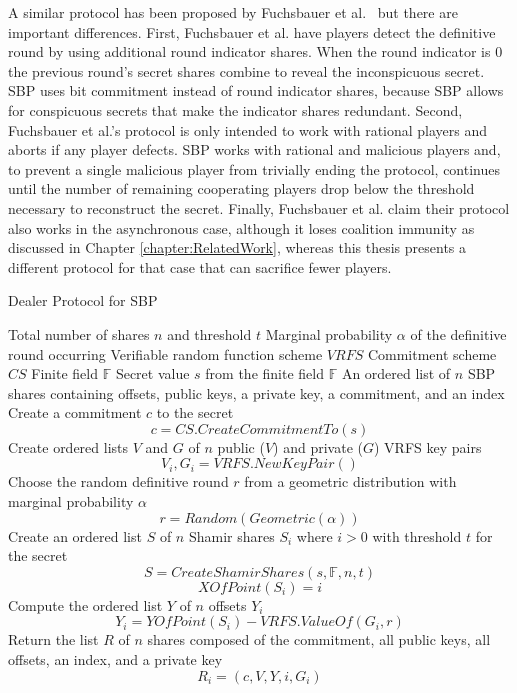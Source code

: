\documentclass[12pt]{dalcsthesis}
\begin{document}
A similar protocol has been proposed by Fuchsbauer et al.~\cite{fuch10} but there are important differences. First, Fuchsbauer et al. have players detect the definitive round by using additional round indicator shares. When the round indicator is 0 the previous round's secret shares combine to reveal the inconspicuous secret. SBP uses bit commitment instead of round indicator shares, because SBP allows for conspicuous secrets that make the indicator shares redundant. Second, Fuchsbauer et al.'s protocol is only intended to work with rational players and aborts if any player defects. SBP works with rational and malicious players and, to prevent a single malicious player from trivially ending the protocol, continues until the number of remaining cooperating players drop below the threshold necessary to reconstruct the secret. Finally, Fuchsbauer et al. claim their protocol also works in the asynchronous case, although it loses coalition immunity as discussed in Chapter \ref{chapter:RelatedWork}, whereas this thesis presents a different protocol for that case that can sacrifice fewer players.

\begin{algorithm}
  \caption{Dealer Protocol for SBP}
  \label{alg:SBP:Dealer}
  \begin{algorithmic}
    \INPUT Total number of shares $n$ and threshold $t$
    \INPUT Marginal probability $\alpha$ of the definitive round occurring
    \INPUT Verifiable random function scheme $VRFS$
    \INPUT Commitment scheme $CS$
    \INPUT Finite field $\mathbb{F}$
    \INPUT Secret value $s$ from the finite field $\mathbb{F}$
    \OUTPUT An ordered list of $n$ SBP shares containing offsets, public keys, a private key, a commitment, and an index
    \STATE Create a commitment $c$ to the secret
    	$$c = CS.CreateCommitmentTo(s)$$
    \STATE Create ordered lists $V$ and $G$ of $n$ public ($V$) and private ($G$) VRFS key pairs
    	$$V_i, G_i = VRFS.NewKeyPair()$$
    \STATE Choose the random definitive round $r$ from a geometric distribution with marginal probability $\alpha$
    	$$r = Random(Geometric(\alpha))$$
    \STATE Create an ordered list $S$ of $n$ Shamir shares $S_i$ where $i > 0$ with threshold $t$ for the secret
    	$$S = CreateShamirShares(s, \mathbb{F}, n, t)$$
    	$$XOfPoint(S_i) = i$$
    \STATE Compute the ordered list $Y$ of $n$ offsets $Y_i$
    	$$Y_i = YOfPoint(S_i) - VRFS.ValueOf(G_i, r)$$
    \STATE Return the list $R$ of $n$ shares composed of the commitment, all public keys, all offsets, an index, and a private key
    	$$R_i = (c, V, Y, i, G_i)$$
  \end{algorithmic}
\end{algorithm}
\end{document}
